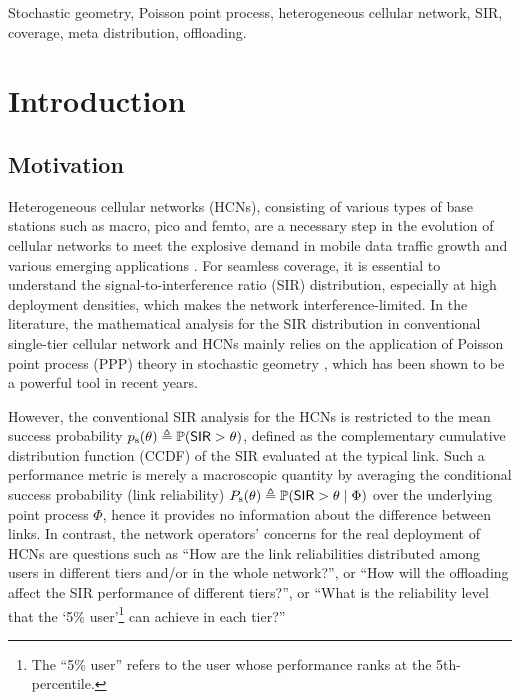 \documentclass[12pt,draftclsnofoot,journal,onecolumn]{IEEEtran}
\def\P{\mathbb{P}}
\def\SIR{\mathsf{SIR}}
\def\ps{p_{\rm s}}
\def\Ps{P_{\rm s}}
\begin{document}
\begin{IEEEkeywords}
	Stochastic geometry, Poisson point process, heterogeneous cellular network, SIR, coverage, meta distribution, offloading. 	
\end{IEEEkeywords}

\section{Introduction}
\subsection{Motivation}
Heterogeneous cellular networks (HCNs), consisting of various types of base stations such as macro, pico and femto, are a necessary step in the evolution of cellular networks to meet the explosive demand in mobile data traffic growth and various emerging applications \cite{GhoshHCN12}. For seamless coverage, it is essential to understand the signal-to-interference ratio (SIR) distribution, especially at high deployment densities, which makes the network interference-limited. In the literature, the mathematical analysis for the SIR distribution in conventional single-tier cellular network and HCNs mainly relies on the application of Poisson point process (PPP) theory in stochastic geometry \cite{Haenggi18book, Andrews11, Dhillon12, Mukherjee12, nigam2014, Singh13, Jo12, Keeler13, Blaszczyszyn15, XZhang14}, which has been shown to be a powerful tool in recent years.  

However, the conventional SIR analysis for the HCNs is restricted to the mean success probability $\ps(\theta)\triangleq\P(\SIR>\theta)$, defined as the complementary cumulative distribution function (CCDF) of the SIR evaluated at the typical link. Such a performance metric is merely a macroscopic quantity by averaging the conditional success probability (link reliability) $\Ps(\theta)\triangleq \P(\SIR>\theta\mid\Phi)$ over the underlying point process $\Phi$, hence it provides no information about the difference between links. In contrast, the network operators' concerns for the real deployment of HCNs are questions such as ``How are the link reliabilities distributed among users in different tiers and/or in the whole network?'', or ``How will the offloading affect the SIR performance of different tiers?'', or ``What is the reliability level that the `5\% user'\footnote[1]{The ``5\% user'' refers to the user whose performance ranks at the 5th-percentile.} can achieve in each tier?''   
\end{document}
